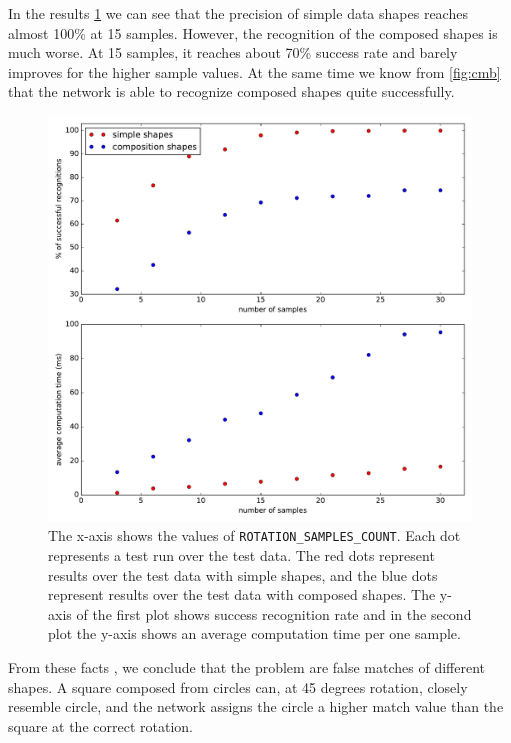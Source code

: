 In the results \cref{fig:rotation} we can see that the precision of simple data shapes reaches almost 100\% at 15 samples. However, the recognition of the composed shapes is much worse. At 15 samples, it reaches about 70\% success rate and barely improves for the higher sample values. At the same time we know from \cref{fig:cmb} that the network is able to recognize composed shapes quite successfully. 

\begin{figure}
\centering
\includegraphics[width=\linewidth]{ext/rotation_cmb.pdf}
\caption{The x-axis shows the values of \texttt{ROTATION\_SAMPLES\_COUNT}. Each dot represents a test run over the test data. The red dots represent results over the test data with simple shapes, and the blue dots represent results over the test data with composed shapes. The y-axis of the first plot shows success recognition rate and in the second plot the y-axis shows an average computation time per one sample.}
\label{fig:rotation}
\end{figure}

From these facts , we conclude that the  problem are false matches of different shapes.  A square composed from circles can, at 45 degrees rotation, closely resemble  circle, and the network assigns the circle a higher match value than the square at the correct rotation. 

